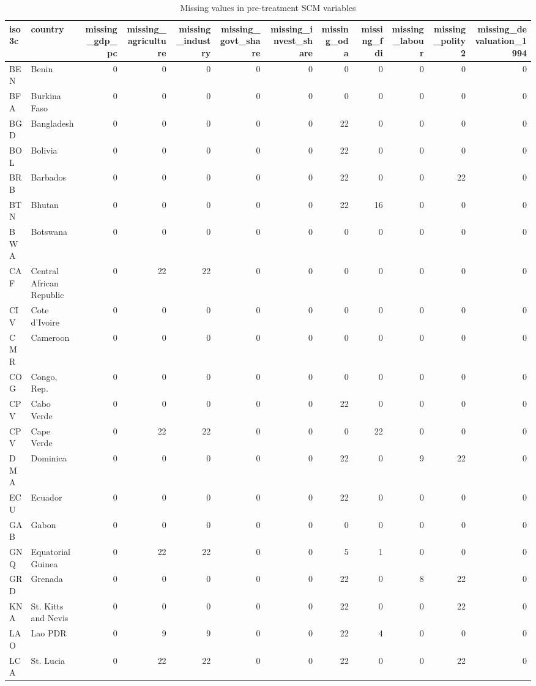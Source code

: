 \begin{table}

\caption{Missing values in pre-treatment SCM variables}
\centering
\begin{tabular}[t]{llrrrrrrrrrr}
\toprule
iso3c & country & missing\_gdp\_pc & missing\_agriculture & missing\_industry & missing\_govt\_share & missing\_invest\_share & missing\_oda & missing\_fdi & missing\_labour & missing\_polity2 & missing\_devaluation\_1994\\
\midrule
BEN & Benin & 0 & 0 & 0 & 0 & 0 & 0 & 0 & 0 & 0 & 0\\
BFA & Burkina Faso & 0 & 0 & 0 & 0 & 0 & 0 & 0 & 0 & 0 & 0\\
BGD & Bangladesh & 0 & 0 & 0 & 0 & 0 & 22 & 0 & 0 & 0 & 0\\
BOL & Bolivia & 0 & 0 & 0 & 0 & 0 & 22 & 0 & 0 & 0 & 0\\
BRB & Barbados & 0 & 0 & 0 & 0 & 0 & 22 & 0 & 0 & 22 & 0\\
\addlinespace
BTN & Bhutan & 0 & 0 & 0 & 0 & 0 & 22 & 16 & 0 & 0 & 0\\
BWA & Botswana & 0 & 0 & 0 & 0 & 0 & 0 & 0 & 0 & 0 & 0\\
CAF & Central African Republic & 0 & 22 & 22 & 0 & 0 & 0 & 0 & 0 & 0 & 0\\
CIV & Cote d'Ivoire & 0 & 0 & 0 & 0 & 0 & 0 & 0 & 0 & 0 & 0\\
CMR & Cameroon & 0 & 0 & 0 & 0 & 0 & 0 & 0 & 0 & 0 & 0\\
\addlinespace
COG & Congo, Rep. & 0 & 0 & 0 & 0 & 0 & 0 & 0 & 0 & 0 & 0\\
CPV & Cabo Verde & 0 & 0 & 0 & 0 & 0 & 22 & 0 & 0 & 0 & 0\\
CPV & Cape Verde & 0 & 22 & 22 & 0 & 0 & 0 & 22 & 0 & 0 & 0\\
DMA & Dominica & 0 & 0 & 0 & 0 & 0 & 22 & 0 & 9 & 22 & 0\\
ECU & Ecuador & 0 & 0 & 0 & 0 & 0 & 22 & 0 & 0 & 0 & 0\\
\addlinespace
GAB & Gabon & 0 & 0 & 0 & 0 & 0 & 0 & 0 & 0 & 0 & 0\\
GNQ & Equatorial Guinea & 0 & 22 & 22 & 0 & 0 & 5 & 1 & 0 & 0 & 0\\
GRD & Grenada & 0 & 0 & 0 & 0 & 0 & 22 & 0 & 8 & 22 & 0\\
KNA & St. Kitts and Nevis & 0 & 0 & 0 & 0 & 0 & 22 & 0 & 0 & 22 & 0\\
LAO & Lao PDR & 0 & 9 & 9 & 0 & 0 & 22 & 4 & 0 & 0 & 0\\
\addlinespace
LCA & St. Lucia & 0 & 22 & 22 & 0 & 0 & 22 & 0 & 0 & 22 & 0\\

\end{tabular}
\end{table}
